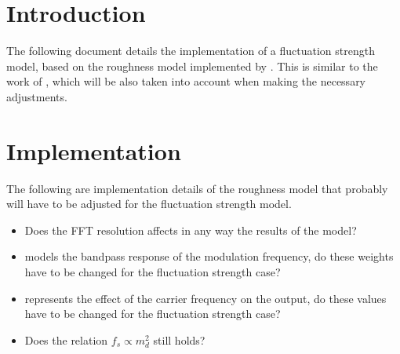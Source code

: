 \documentclass[a4paper]{article}
\begin{document}

\section{Introduction}

The following document details the implementation of a fluctuation strength
model, based on the roughness model implemented by \citeauthor{Schrader2002}.
This is similar to the work of \citeauthor{Sontacchi1998}, which will be also
taken into account when making the necessary adjustments.

\section{Implementation}

The following are implementation details of the roughness model that probably
will have to be adjusted for the fluctuation strength model.

\begin{itemize}
    \item Does the FFT resolution affects in any way the results of the model?
    \item {} models the bandpass response of the modulation
        frequency, do these weights have to be changed for the fluctuation
        strength case?
    \item {} represents the effect of the carrier frequency on
        the output, do these values have to be changed for the fluctuation
        strength case?
    \item Does the relation $f_s \propto m_d ^ 2$ still holds?
\end{itemize}



\end{document}

